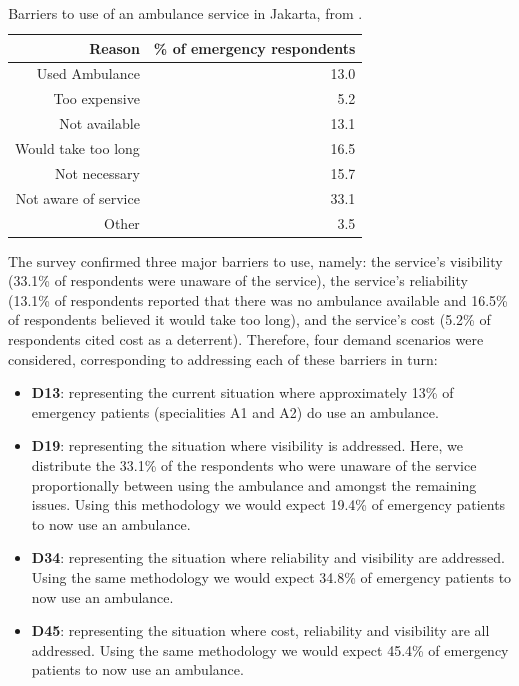 \documentclass[preprint,12pt]{elsarticle}
\begin{document}
\begin{table}
\centering
\begin{tabular}{rr}
\toprule
Reason & \% of emergency respondents \\
\midrule
Used Ambulance & 13.0\\
Too expensive & 5.2  \\
Not available  & 13.1 \\
Would take too long & 16.5 \\
Not necessary & 15.7  \\
Not aware of service & 33.1\\
Other &3.5 \\
\bottomrule
\end{tabular}
\caption{Barriers to use of an ambulance service in Jakarta, from
         \cite{BriceSyaribahNoor2022Esui}.}
\label{table:survey_results}
\end{table}

The survey confirmed three major barriers to use, namely: the service's
visibility (33.1\% of respondents were unaware of the service), the service's
reliability (13.1\% of respondents reported that there was no ambulance
available and 16.5\% of respondents believed it would take too long), and the
service's cost (5.2\% of respondents cited cost as a deterrent). Therefore,
four demand scenarios were considered, corresponding to addressing each of
these barriers in turn:

\begin{itemize}
  \item \textbf{D13}: representing the current situation where approximately
        13\% of emergency patients (specialities A1 and A2) do use an ambulance.
  \item \textbf{D19}: representing the situation where visibility is addressed.
        Here, we distribute the 33.1\% of the respondents who were unaware of
        the service proportionally between using the ambulance and amongst the
        remaining issues. Using this methodology we would expect 19.4\% of
        emergency patients to now use an ambulance.  
  \item \textbf{D34}: representing the situation where reliability and
        visibility are addressed. Using the same methodology we would expect
        34.8\% of emergency patients to now use an ambulance.
  \item \textbf{D45}: representing the situation where cost, reliability and
        visibility are all addressed. Using the same methodology we would expect
        45.4\% of emergency patients to now use an ambulance. 
\end{itemize}
\end{document}
